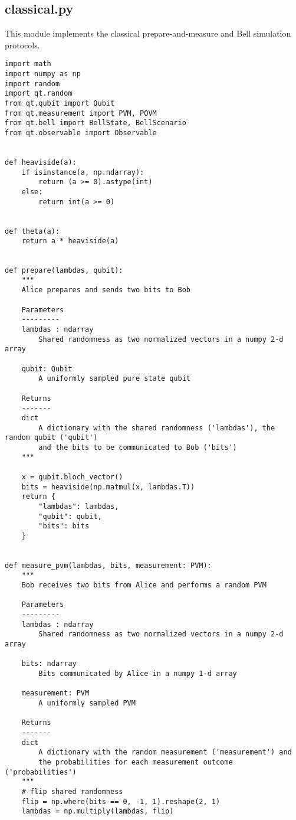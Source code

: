 \subsection{classical.py}\label{section:listings_classical}
This module implements the classical prepare-and-measure and Bell simulation protocols. 
\begin{verbatim}
import math
import numpy as np
import random
import qt.random
from qt.qubit import Qubit
from qt.measurement import PVM, POVM
from qt.bell import BellState, BellScenario
from qt.observable import Observable


def heaviside(a):
    if isinstance(a, np.ndarray):
        return (a >= 0).astype(int)
    else:
        return int(a >= 0)


def theta(a):
    return a * heaviside(a)


def prepare(lambdas, qubit):
    """
    Alice prepares and sends two bits to Bob

    Parameters
    ---------
    lambdas : ndarray
        Shared randomness as two normalized vectors in a numpy 2-d array

    qubit: Qubit
        A uniformly sampled pure state qubit

    Returns
    -------
    dict
        A dictionary with the shared randomness ('lambdas'), the random qubit ('qubit')
        and the bits to be communicated to Bob ('bits')
    """

    x = qubit.bloch_vector()
    bits = heaviside(np.matmul(x, lambdas.T))
    return {
        "lambdas": lambdas,
        "qubit": qubit,
        "bits": bits
    }


def measure_pvm(lambdas, bits, measurement: PVM):
    """
    Bob receives two bits from Alice and performs a random PVM

    Parameters
    ---------
    lambdas : ndarray
        Shared randomness as two normalized vectors in a numpy 2-d array

    bits: ndarray
        Bits communicated by Alice in a numpy 1-d array

    measurement: PVM
        A uniformly sampled PVM

    Returns
    -------
    dict
        A dictionary with the random measurement ('measurement') and
        the probabilities for each measurement outcome ('probabilities')
    """
    # flip shared randomness
    flip = np.where(bits == 0, -1, 1).reshape(2, 1)
    lambdas = np.multiply(lambdas, flip)


\end{verbatim}
